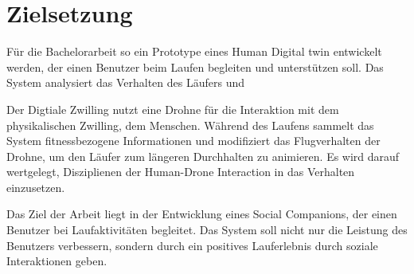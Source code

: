 \section{Zielsetzung}
Für die Bachelorarbeit so ein Prototype eines Human Digital twin entwickelt werden, der einen Benutzer beim Laufen begleiten und unterstützen soll.  Das System analysiert das Verhalten des Läufers und 

Der Digtiale Zwilling nutzt eine Drohne für die Interaktion mit dem physikalischen Zwilling, dem Menschen. Während des Laufens sammelt das System fitnessbezogene Informationen und modifiziert das Flugverhalten der Drohne, um den Läufer zum längeren Durchhalten zu animieren. Es wird darauf wertgelegt, Disziplienen der Human-Drone Interaction in das Verhalten einzusetzen. 

Das Ziel der Arbeit liegt in der Entwicklung eines Social Companions, der einen Benutzer bei Laufaktivitäten begleitet. Das System soll nicht nur die Leistung des Benutzers verbessern, sondern durch ein positives Lauferlebnis durch soziale Interaktionen geben. 

